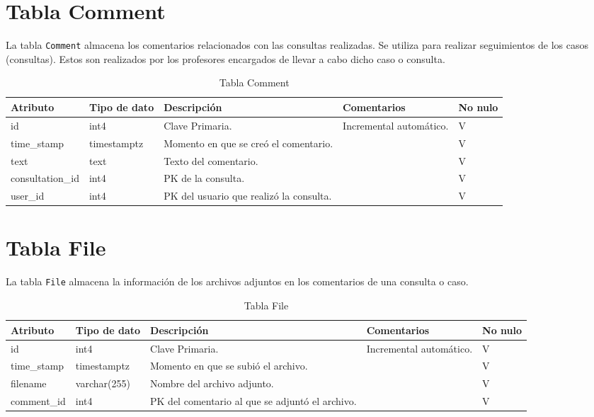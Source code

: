 \section{Tabla Comment}\label{sec:table-comment}
La tabla \texttt{Comment} almacena los comentarios relacionados con las consultas realizadas. Se utiliza para realizar seguimientos de los casos (consultas). Estos son realizados por los profesores encargados de llevar a cabo dicho caso o consulta.

\begin{table}[H]
\centering
\label{tab:comment}
\begin{tabular}{|p{3cm}|p{2.5cm}|p{4.5cm}|p{4cm}|p{1cm}|}
\hline
\textbf{Atributo} & \textbf{Tipo de dato}  & \textbf{Descripción} & \textbf{Comentarios} & \textbf{No nulo} \\ \hline
id & int4 & Clave Primaria. & Incremental automático. & V \\ \hline
time\_stamp & timestamptz & Momento en que se creó el comentario. &  & V \\ \hline
text & text & Texto del comentario. &  & V \\ \hline
consultation\_id & int4 & PK de la consulta. &  & V \\ \hline
user\_id & int4 & PK del usuario que realizó la consulta. &  & V \\ \hline
\end{tabular}
\caption{Tabla Comment}
\end{table}


\section{Tabla File}\label{sec:table-file}
La tabla \texttt{File} almacena la información de los archivos adjuntos en los comentarios de una consulta o caso.

\begin{table}[H]
\centering
\label{tab:file}
\begin{tabular}{|p{3cm}|p{2.5cm}|p{4.5cm}|p{4cm}|p{1cm}|}
\hline
\textbf{Atributo} & \textbf{Tipo de dato}  & \textbf{Descripción} & \textbf{Comentarios} & \textbf{No nulo} \\ \hline
id & int4 & Clave Primaria. & Incremental automático. & V \\ \hline
time\_stamp & timestamptz & Momento en que se subió el archivo. &  & V \\ \hline
filename & varchar(255) & Nombre del archivo adjunto. &  & V \\ \hline
comment\_id & int4 & PK del comentario al que se adjuntó el archivo. &  & V \\ \hline
\end{tabular}
\caption{Tabla File}
\end{table}


